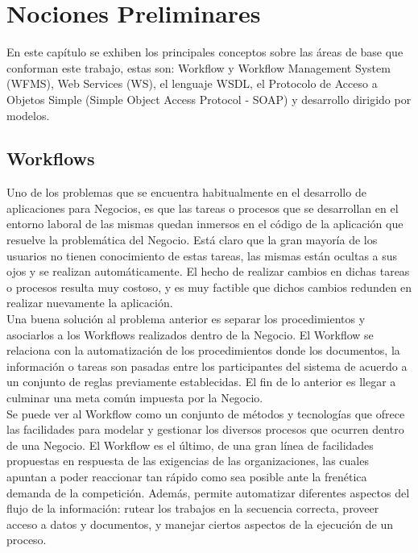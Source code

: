 \chapter{Nociones Preliminares}
\label{Nociones Preliminares}


En este capítulo se exhiben los principales conceptos sobre las áreas de base que conforman este trabajo, estas son: Workflow y Workflow Management System (WFMS), Web Services (WS), el lenguaje WSDL, el Protocolo de Acceso a Objetos Simple (Simple Object Access Protocol - SOAP) y desarrollo dirigido por modelos.

\section{Workflows}
\label{Workflows}

Uno de los problemas que se encuentra habitualmente en el desarrollo de aplicaciones para Negocios, es que las tareas o procesos que se desarrollan en el entorno laboral de las mismas quedan inmersos en el código de la aplicación que resuelve la problemática del Negocio. Está claro que la gran mayoría de los usuarios no tienen conocimiento de estas tareas, las mismas están ocultas a sus ojos y se realizan automáticamente. El hecho de realizar cambios en dichas tareas o procesos resulta muy costoso, y es muy factible que dichos cambios redunden en realizar nuevamente la aplicación.\\

Una buena solución al problema anterior es separar los procedimientos y asociarlos a los Workflows realizados dentro de la Negocio. El Workflow se relaciona con la automatización de los procedimientos donde los documentos, la información o tareas son pasadas entre los participantes del sistema de acuerdo a un conjunto de reglas previamente establecidas. El fin de lo anterior es llegar a culminar una meta común impuesta por la Negocio.\\

Se puede ver al Workflow como un conjunto de métodos y tecnologías que ofrece las facilidades para modelar y gestionar los diversos procesos que ocurren dentro de una Negocio. El Workflow es el último, de una gran línea de facilidades propuestas en respuesta de las exigencias de las organizaciones, las cuales apuntan a poder reaccionar tan rápido como sea posible ante la frenética demanda de la competición. Además, permite automatizar diferentes aspectos del flujo de la información: rutear los trabajos en la secuencia correcta, proveer acceso a datos y documentos, y manejar ciertos aspectos de la ejecución de un proceso.\\

